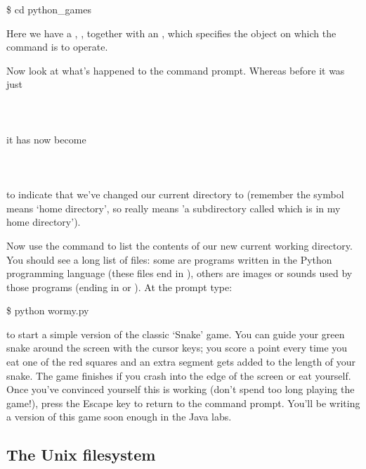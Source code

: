 \begin{ttoutenv}
\$ cd python_games
\end{ttoutenv}

Here we have a , , together with an ,  which specifies the object on which the command is to operate.

Now look at what's happened to the command prompt. Whereas before it was just
\\
\\
\\
\\
it has now become
\\
\\
\\
\\
to indicate that we've changed our current directory to  (remember the \texttildelow{} symbol means `home directory', so  really means 'a subdirectory called  which is in my home directory').

Now use the  command to list the contents of our new current working directory. You should see a long list of files: some are programs written in the Python programming language (these files end in ), others are images or sounds used by those programs (ending in  or ). At the prompt type:

\begin{ttoutenv}
\$ python wormy.py
\end{ttoutenv}

to start a simple version of the classic `Snake' game. You can guide your green snake around the screen with the cursor keys; you score a point every time you eat one of the red squares and an extra segment gets added to the length of your snake. The game finishes if you crash into the edge of the screen or eat yourself. Once you've convinced yourself this is working (don't spend too long playing the game!), press the Escape key to return to the command prompt. You'll be writing a version of this game soon enough in the Java labs.


\FloatBarrier

\subsection{The Unix filesystem}

